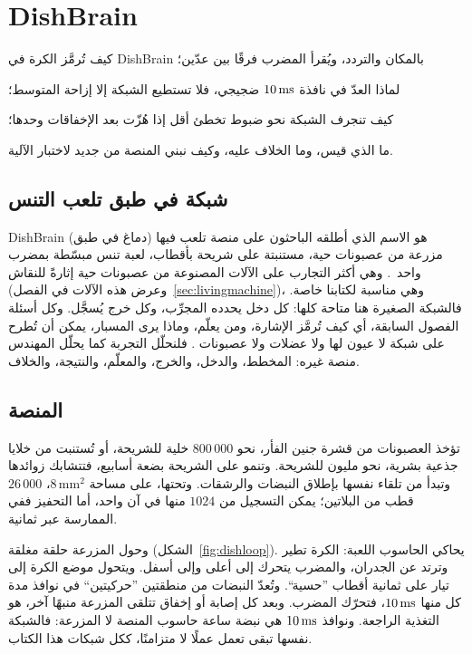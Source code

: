 \chapter{\foreignlanguage{english}{DishBrain}}
\label{sec:dishbrain}
\begin{chaptergoals}
\item كيف تُرمَّز الكرة في \foreignlanguage{english}{DishBrain} بالمكان والتردد، ويُقرأ المضرب فرقًا بين عدّين؛
\item لماذا العدّ في نافذة $10\,\text{ms}$ ضجيجي، فلا تستطيع الشبكة إلا إزاحة المتوسط؛
\item كيف تنجرف الشبكة نحو ضبوط تخطئ أقل إذا هُزّت بعد الإخفاقات وحدها؛
\item ما الذي قيس، وما الخلاف عليه، وكيف نبني المنصة من جديد لاختبار الآلية.
\end{chaptergoals}

\section{شبكة في طبق تلعب التنس}

\foreignlanguage{english}{DishBrain} (دماغ في طبق) هو الاسم الذي أطلقه الباحثون على منصة تلعب فيها مزرعة من عصبونات حية، مستنبتة على شريحة بأقطاب، لعبة تنس مبسّطة بمضرب واحد~\cite{Kagan2022}. وهي أكثر التجارب على الآلات المصنوعة من عصبونات حية إثارةً للنقاش (وعرض هذه الآلات في الفصل~\ref{sec:livingmachine})، وهي مناسبة لكتابنا خاصة. فالشبكة الصغيرة هنا متاحة كلها: كل دخل يحدده المجرِّب، وكل خرج يُسجَّل. وكل أسئلة الفصول السابقة، أي كيف تُرمَّز الإشارة، ومن يعلّم، وماذا يرى المسبار، يمكن أن تُطرح على شبكة لا عيون لها ولا عضلات ولا عصبونات . فلنحلّل التجربة كما يحلّل المهندس منصة غيره: المخطط، والدخل، والخرج، والمعلّم، والنتيجة، والخلاف.

\section{المنصة}

تؤخذ العصبونات من قشرة جنين الفأر، نحو $800\,000$ خلية للشريحة، أو تُستنبت من خلايا جذعية بشرية، نحو مليون للشريحة. وتنمو على الشريحة بضعة أسابيع، فتتشابك زوائدها وتبدأ من تلقاء نفسها بإطلاق النبضات والرشقات. وتحتها، على مساحة $8\,\text{mm}^2$، $26\,000$ قطب من البلاتين؛ يمكن التسجيل من $1024$ منها في آن واحد، أما التحفيز ففي الممارسة عبر ثمانية.

وحول المزرعة حلقة مغلقة (الشكل~\ref{fig:dishloop}). يحاكي الحاسوب اللعبة: الكرة تطير وترتد عن الجدران، والمضرب يتحرك إلى أعلى وإلى أسفل. ويتحول موضع الكرة إلى تيار على ثمانية أقطاب ”حسية“. وتُعدّ النبضات من منطقتين ”حركيتين“ في نوافذ مدة كل منها $10\,\text{ms}$، فتحرّك المضرب. وبعد كل إصابة أو إخفاق تتلقى المزرعة منبهًا آخر، هو التغذية الراجعة. ونوافذ $10\,\text{ms}$ هي نبضة ساعة حاسوب المنصة لا المزرعة: فالشبكة نفسها تبقى تعمل عملًا لا متزامنًا، ككل شبكات هذا الكتاب.

